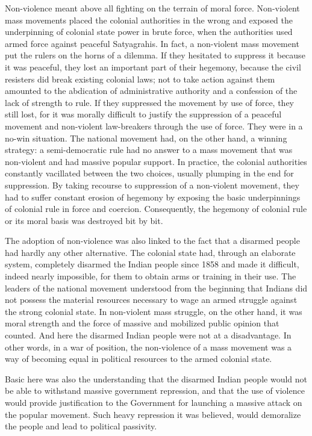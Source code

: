 \begin{multicols}{2}
Non-violence meant above all fighting on the terrain of moral force. Non-violent mass movements placed the colonial authorities in the wrong and exposed the underpinning of colonial state power in brute force, when the authorities used armed force against peaceful Satyagrahis. In fact, a non-violent mass movement put the rulers on the horns of a dilemma. If they hesitated to suppress it because it was peaceful, they lost an important part of their hegemony, because the civil resisters did break existing colonial laws; not to take action against them amounted to the abdication of administrative authority and a confession of the lack of strength to rule. If they suppressed the movement by use of force, they still lost, for it was morally difficult to justify the suppression of a peaceful movement and non-violent law-breakers through the use of force. They were in a no-win situation. The national movement had, on the other hand, a winning strategy: a semi-democratic rule had no answer to a mass movement that was non-violent and had massive popular support. In practice, the colonial authorities constantly vacillated between the two choices, usually plumping in the end for suppression. By taking recourse to suppression of a non-violent movement, they had to suffer constant erosion of hegemony by exposing the basic underpinnings of colonial rule in force and coercion. Consequently, the hegemony of colonial rule or its moral basis was destroyed bit by bit.

The adoption of non-violence was also linked to the fact that a disarmed people had hardly any other alternative. The colonial state had, through an elaborate system, completely disarmed the Indian people since 1858 and made it difficult, indeed nearly impossible, for them to obtain arms or training in their use. The leaders of the national movement understood from the beginning that Indians did not possess the material resources necessary to wage an armed struggle against the strong colonial state. In non-violent mass struggle, on the other hand, it was moral strength and the force of massive and mobilized public opinion that counted. And here the disarmed Indian people were not at a disadvantage. In other words, in a war of position, the non-violence of a mass movement was a way of becoming equal in political resources to the armed colonial state.

Basic here was also the understanding that the disarmed Indian people would not be able to withstand massive government repression, and that the use of violence would provide justification to the Government for launching a massive attack on the popular movement. Such heavy repression it was believed, would demoralize the people and lead to political passivity.


\end{multicols}
